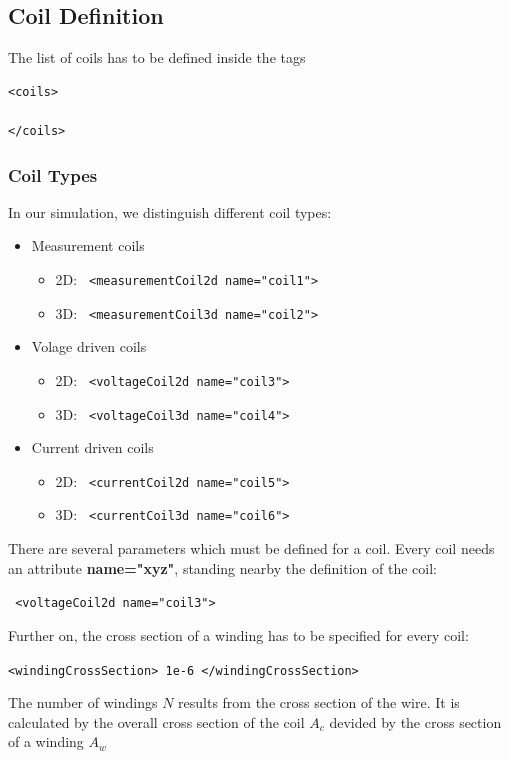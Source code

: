 \subsection{Coil Definition}

The list of coils has to be defined inside the tags

\begin{verbatim}
<coils>

</coils>
\end{verbatim}

\subsubsection{Coil Types}

In our simulation, we distinguish different coil types:
\begin{itemize}
\item Measurement coils
  \begin{itemize}
  \item 2D: \verb! <measurementCoil2d name="coil1">!
  \item 3D: \verb! <measurementCoil3d name="coil2">!
  \end{itemize}
\item Volage driven coils 
  \begin{itemize}
  \item 2D: \verb! <voltageCoil2d name="coil3">!
  \item 3D: \verb! <voltageCoil3d name="coil4">!
  \end{itemize}
\item Current driven coils 
  \begin{itemize}
  \item 2D: \verb! <currentCoil2d name="coil5">!
  \item 3D: \verb! <currentCoil3d name="coil6">!
  \end{itemize}
\end{itemize}


There are several parameters which must be defined for a coil. Every
coil needs an attribute {\bf name="xyz"}, standing nearby the
definition of the coil:

\verb! <voltageCoil2d name="coil3">!

\noindent
Further on, the cross section of a winding has to be
specified for every coil:

\verb!<windingCrossSection> 1e-6 </windingCrossSection>!

\noindent
The number of windings $N$ results from the cross section of the wire. It
is calculated by the overall cross section of the coil $A_c$ devided
by the cross section of a winding $A_w$

